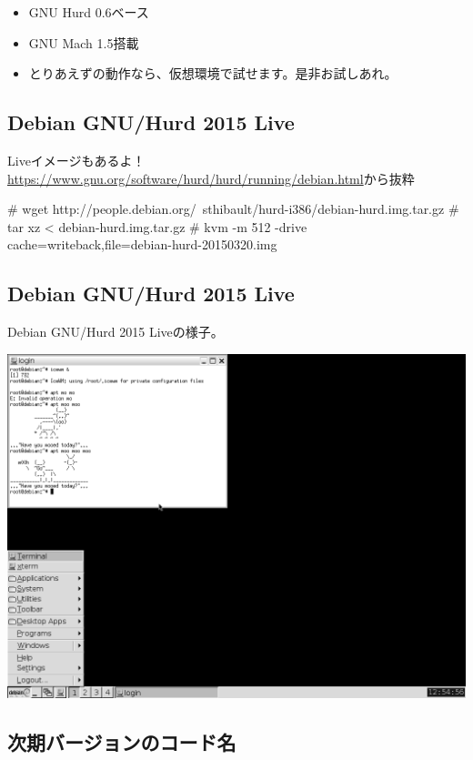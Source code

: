\documentclass[mingoth,a4paper]{jsarticle}
\begin{document}
\begin{itemize}
\item GNU Hurd 0.6ベース
\item GNU Mach 1.5搭載
\item とりあえずの動作なら、仮想環境で試せます。是非お試しあれ。
\end{itemize}


\subsection{Debian GNU/Hurd 2015 Live}

  Liveイメージもあるよ！\\
\url{https://www.gnu.org/software/hurd/hurd/running/debian.html}から抜粋

\begin{commandline}
# wget http://people.debian.org/~sthibault/hurd-i386/debian-hurd.img.tar.gz
# tar xz < debian-hurd.img.tar.gz
# kvm -m 512 -drive cache=writeback,file=debian-hurd-20150320.img
\end{commandline}
  

\subsection{Debian GNU/Hurd 2015 Live}

Debian GNU/Hurd 2015 Liveの様子。

\begin{center}
 \includegraphics[width=0.9\hsize]{image201509/gnu-hurd-live_mono.png}
\end{center}
 
\subsection{次期バージョンのコード名}
\end{document}
